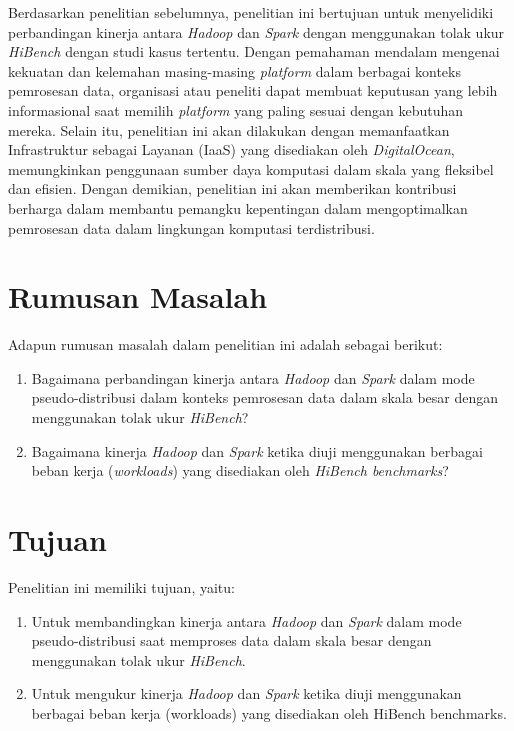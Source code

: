 
Berdasarkan penelitian sebelumnya, penelitian ini bertujuan untuk menyelidiki perbandingan kinerja antara \textit{Hadoop} dan \textit{Spark} dengan menggunakan tolak ukur \textit{HiBench} dengan studi kasus tertentu. Dengan pemahaman mendalam mengenai kekuatan dan kelemahan masing-masing \textit{platform} dalam berbagai konteks pemrosesan data, organisasi atau peneliti dapat membuat keputusan yang lebih informasional saat memilih \textit{platform} yang paling sesuai dengan kebutuhan mereka. Selain itu, penelitian ini akan dilakukan dengan memanfaatkan Infrastruktur sebagai Layanan (IaaS) yang disediakan oleh \textit{DigitalOcean}, memungkinkan penggunaan sumber daya komputasi dalam skala yang fleksibel dan efisien. Dengan demikian, penelitian ini akan memberikan kontribusi berharga dalam membantu pemangku kepentingan dalam mengoptimalkan pemrosesan data dalam lingkungan komputasi terdistribusi.


\section{Rumusan Masalah}
Adapun rumusan masalah dalam penelitian ini adalah sebagai berikut:
\begin{enumerate}
	\item 
	Bagaimana perbandingan kinerja antara \textit{Hadoop} dan \textit{Spark} dalam mode pseudo-distribusi dalam konteks pemrosesan data dalam skala besar dengan menggunakan tolak ukur \textit{HiBench}?
	\item
	Bagaimana kinerja \textit{Hadoop} dan \textit{Spark} ketika diuji menggunakan berbagai beban kerja (\textit{workloads}) yang disediakan oleh \textit{HiBench benchmarks}?
\end{enumerate}

\section{Tujuan}
Penelitian ini memiliki tujuan, yaitu:
	\begin{enumerate}
		\item 
		Untuk membandingkan kinerja antara \textit{Hadoop} dan \textit{Spark} dalam mode pseudo-distribusi saat memproses data dalam skala besar dengan menggunakan tolak ukur \textit{HiBench}.
		\item
		Untuk mengukur kinerja \textit{Hadoop} dan \textit{Spark} ketika diuji menggunakan berbagai beban kerja (workloads) yang disediakan oleh HiBench benchmarks.
	\end{enumerate}

